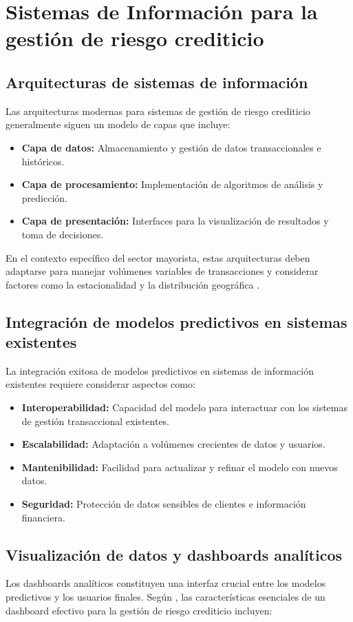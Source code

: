\section{Sistemas de Información para la gestión de riesgo crediticio}
\subsection{Arquitecturas de sistemas de información}
Las arquitecturas modernas para sistemas de gestión de riesgo crediticio generalmente siguen un modelo de capas que incluye:

\begin{itemize}
    \item \textbf{Capa de datos:} Almacenamiento y gestión de datos transaccionales e históricos.
    \item \textbf{Capa de procesamiento:} Implementación de algoritmos de análisis y predicción.
    \item \textbf{Capa de presentación:} Interfaces para la visualización de resultados y toma de decisiones.
\end{itemize}

En el contexto específico del sector mayorista, estas arquitecturas deben adaptarse para manejar volúmenes variables de transacciones y considerar factores como la estacionalidad y la distribución geográfica \cite{ramirez2023predictive}.

\subsection{Integración de modelos predictivos en sistemas existentes}
La integración exitosa de modelos predictivos en sistemas de información existentes requiere considerar aspectos como:

\begin{itemize}
    \item \textbf{Interoperabilidad:} Capacidad del modelo para interactuar con los sistemas de gestión transaccional existentes.
    \item \textbf{Escalabilidad:} Adaptación a volúmenes crecientes de datos y usuarios.
    \item \textbf{Mantenibilidad:} Facilidad para actualizar y refinar el modelo con nuevos datos.
    \item \textbf{Seguridad:} Protección de datos sensibles de clientes e información financiera.
\end{itemize}

\subsection{Visualización de datos y dashboards analíticos}
Los dashboards analíticos constituyen una interfaz crucial entre los modelos predictivos y los usuarios finales. Según \cite{torres2023inteligencia}, las características esenciales de un dashboard efectivo para la gestión de riesgo crediticio incluyen:


